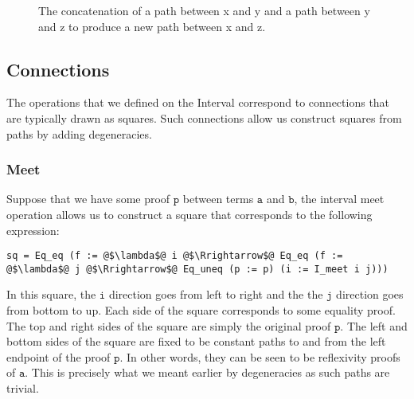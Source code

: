 \documentclass[12pt,twoside,maitrise]{dms}
\theoremstyle{definition}
\numberwithin{equation}{section}
\numberwithin{table}{chapter}
\numberwithin{figure}{chapter}
\newcommand\fn[1] {\texttt{#1}}
\begin{document}
\begin{figure}[H]

\caption{The concatenation of a path between x and y and a path between y and z to produce a new path between x and z.}
\end{figure}

\subsection*{Connections}\label{subsec:interval-connections}

The operations that we defined on the Interval correspond to
connections\cite{cohen2016cubical} that are typically drawn as squares. Such
connections allow us construct squares from paths by adding degeneracies.

\subsubsection*{Meet}

Suppose that we have some proof $\fn{p}$ between terms $\fn{a}$ and $\fn{b}$,
the interval meet operation allows us to construct a square that corresponds to
the following expression:

\begin{verbatim}
sq = Eq_eq (f := @$\lambda$@ i @$\Rrightarrow$@ Eq_eq (f := @$\lambda$@ j @$\Rrightarrow$@ Eq_uneq (p := p) (i := I_meet i j)))
\end{verbatim}

In this square, the $\fn{i}$ direction goes from left to right and the the
$\fn{j}$ direction goes from bottom to up. Each side of the square corresponds
to some equality proof. The top and right sides of the square are simply the
original proof $\fn{p}$. The left and bottom sides of the square are fixed to be
constant paths to and from the left endpoint of the proof $\fn{p}$. In other
words, they can be seen to be reflexivity proofs of $\fn{a}$. This is precisely
what we meant earlier by degeneracies as such paths are trivial.
\end{document}

